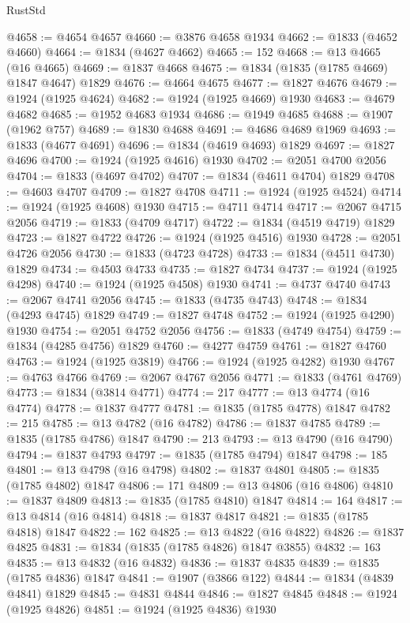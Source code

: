 \begin{lexlean}{RustStd}
\begin{coremodule}
@4658 := @4654 @4657
@4660 := @3876 @4658 @1934
@4662 := @1833 (@4652 @4660)
@4664 := @1834 (@4627 @4662)
@4665 := 152
@4668 := @13 @4665 (@16 @4665)
@4669 := @1837 @4668
@4675 := @1834 (@1835 (@1785 @4669) @1847 @4647) @1829
@4676 := @4664 @4675
@4677 := @1827 @4676
@4679 := @1924 (@1925 @4624)
@4682 := @1924 (@1925 @4669) @1930
@4683 := @4679 @4682
@4685 := @1952 @4683 @1934
@4686 := @1949 @4685
@4688 := @1907 (@1962 @757)
@4689 := @1830 @4688
@4691 := @4686 @4689 @1969
@4693 := @1833 (@4677 @4691)
@4696 := @1834 (@4619 @4693) @1829
@4697 := @1827 @4696
@4700 := @1924 (@1925 @4616) @1930
@4702 := @2051 @4700 @2056
@4704 := @1833 (@4697 @4702)
@4707 := @1834 (@4611 @4704) @1829
@4708 := @4603 @4707
@4709 := @1827 @4708
@4711 := @1924 (@1925 @4524)
@4714 := @1924 (@1925 @4608) @1930
@4715 := @4711 @4714
@4717 := @2067 @4715 @2056
@4719 := @1833 (@4709 @4717)
@4722 := @1834 (@4519 @4719) @1829
@4723 := @1827 @4722
@4726 := @1924 (@1925 @4516) @1930
@4728 := @2051 @4726 @2056
@4730 := @1833 (@4723 @4728)
@4733 := @1834 (@4511 @4730) @1829
@4734 := @4503 @4733
@4735 := @1827 @4734
@4737 := @1924 (@1925 @4298)
@4740 := @1924 (@1925 @4508) @1930
@4741 := @4737 @4740
@4743 := @2067 @4741 @2056
@4745 := @1833 (@4735 @4743)
@4748 := @1834 (@4293 @4745) @1829
@4749 := @1827 @4748
@4752 := @1924 (@1925 @4290) @1930
@4754 := @2051 @4752 @2056
@4756 := @1833 (@4749 @4754)
@4759 := @1834 (@4285 @4756) @1829
@4760 := @4277 @4759
@4761 := @1827 @4760
@4763 := @1924 (@1925 @3819)
@4766 := @1924 (@1925 @4282) @1930
@4767 := @4763 @4766
@4769 := @2067 @4767 @2056
@4771 := @1833 (@4761 @4769)
@4773 := @1834 (@3814 @4771)
@4774 := 217
@4777 := @13 @4774 (@16 @4774)
@4778 := @1837 @4777
@4781 := @1835 (@1785 @4778) @1847
@4782 := 215
@4785 := @13 @4782 (@16 @4782)
@4786 := @1837 @4785
@4789 := @1835 (@1785 @4786) @1847
@4790 := 213
@4793 := @13 @4790 (@16 @4790)
@4794 := @1837 @4793
@4797 := @1835 (@1785 @4794) @1847
@4798 := 185
@4801 := @13 @4798 (@16 @4798)
@4802 := @1837 @4801
@4805 := @1835 (@1785 @4802) @1847
@4806 := 171
@4809 := @13 @4806 (@16 @4806)
@4810 := @1837 @4809
@4813 := @1835 (@1785 @4810) @1847
@4814 := 164
@4817 := @13 @4814 (@16 @4814)
@4818 := @1837 @4817
@4821 := @1835 (@1785 @4818) @1847
@4822 := 162
@4825 := @13 @4822 (@16 @4822)
@4826 := @1837 @4825
@4831 := @1834 (@1835 (@1785 @4826) @1847 @3855)
@4832 := 163
@4835 := @13 @4832 (@16 @4832)
@4836 := @1837 @4835
@4839 := @1835 (@1785 @4836) @1847
@4841 := @1907 (@3866 @122)
@4844 := @1834 (@4839 @4841) @1829
@4845 := @4831 @4844
@4846 := @1827 @4845
@4848 := @1924 (@1925 @4826)
@4851 := @1924 (@1925 @4836) @1930

\end{coremodule}
\end{lexlean}
